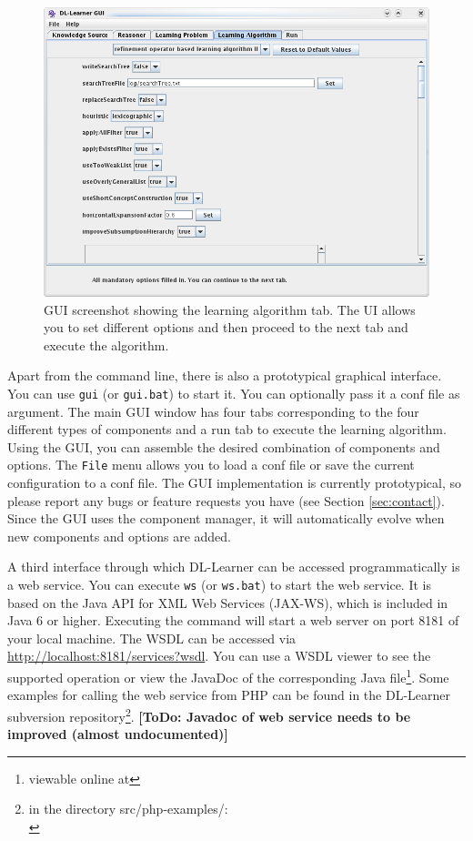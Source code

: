 \documentclass[a4paper,12pt]{scrartcl}
\newcommand{\todo}[1]{\textbf{[ToDo: #1]}}
\begin{document}
\begin{figure}
 \centering
 \includegraphics[width=.8\textwidth]{../../resources/screenshots/gui_algorithm}
 \caption{GUI screenshot showing the learning algorithm tab. The UI allows you to set different options and then proceed to the next tab and execute the algorithm.}
 \label{fig:gui}
\end{figure}

Apart from the command line, there is also a prototypical graphical interface. You can use \verb|gui| (or \verb|gui.bat|) to start it. You can optionally pass it a conf file as argument. The main GUI window has four tabs corresponding to the four different types of components and a run tab to execute the learning algorithm. Using the GUI, you can assemble the desired combination of components and options. The \verb|File| menu allows you to load a conf file or save the current configuration to a conf file. The GUI implementation is currently prototypical, so please report any bugs or feature requests you have (see Section \ref{sec:contact}). Since the GUI uses the component manager, it will automatically evolve when new components and options are added.

A third interface through which DL-Learner can be accessed programmatically is a web service. You can execute \verb|ws| (or \verb|ws.bat|) to start the web service. It is based on the Java API for XML Web Services (JAX-WS), which is included in Java 6 or higher. Executing the command will start a web server on port 8181 of your local machine. The WSDL can be accessed via \url{http://localhost:8181/services?wsdl}. You can use a WSDL viewer to see the supported operation 
or view the JavaDoc of the corresponding Java file\footnote{viewable online at \wsjavadoc}. 
Some examples for calling the web service from PHP can be found in the DL-Learner subversion 
repository\footnote{in the directory src/php-examples/:\\ \wsphpexamples}.
\todo{Javadoc of web service needs to be improved (almost undocumented)}
\end{document}
